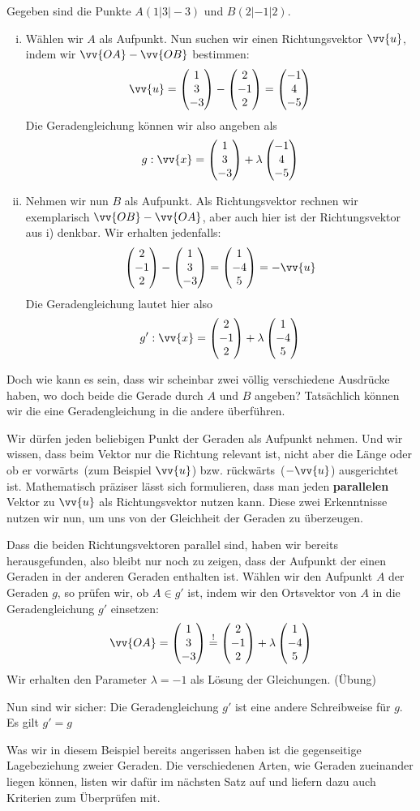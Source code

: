 \documentclass[ngerman, 12pt]{nssheetxea}
\begin{document}
\begin{example}
Gegeben sind die Punkte $A(1|3|-3)$ und $B(2|-1|2)$. 
\begin{enumerate} [i)]
\item Wählen wir $A$ als Aufpunkt. Nun suchen wir einen Richtungsvektor $\vv{u}$, indem wir $\vv{OA}-\vv{OB}$ bestimmen:
\[ \vv{u}= \colvec[1]{3}{-3}-\colvec[2]{-1}{2} = \colvec[-1]{4}{-5}\]
Die Geradengleichung können wir also angeben als 
\[ g:\vv{x} = \colvec[1]{3}{-3}+\lambda \colvec[-1]{4}{-5}\]
\item Nehmen wir nun $B$ als Aufpunkt. Als Richtungsvektor rechnen wir exemplarisch $\vv{OB}-\vv{OA}$, aber auch hier ist der Richtungsvektor aus i) denkbar. Wir erhalten jedenfalls:
\[ \colvec[2]{-1}{2} - \colvec[1]{3}{-3} = \colvec[1]{-4}{5} = -\vv{u}\]
Die Geradengleichung lautet hier also
\[ g':\vv{x} = \colvec[2]{-1}{2} + \lambda \colvec[1]{-4}{5}\]
\end{enumerate}
Doch wie kann es sein, dass wir scheinbar zwei völlig verschiedene Ausdrücke haben, wo doch beide die Gerade durch $A$ und $B$ angeben? Tatsächlich können wir die eine Geradengleichung in die andere überführen. \par
Wir dürfen jeden beliebigen Punkt der Geraden als Aufpunkt nehmen. Und wir wissen, dass beim Vektor nur die Richtung relevant ist, nicht aber die Länge oder ob er \glqq vorwärts\grqq \ (zum Beispiel $\vv{u}$) bzw. \glqq rückwärts\grqq \ ($-\vv{u}$) ausgerichtet ist. Mathematisch präziser lässt sich formulieren, dass man jeden \textbf{parallelen} Vektor zu $\vv{u}$ als Richtungsvektor nutzen kann. Diese zwei Erkenntnisse nutzen wir nun, um uns von der Gleichheit der Geraden zu überzeugen. \par
Dass die beiden Richtungsvektoren parallel sind, haben wir bereits herausgefunden, also bleibt nur noch zu zeigen, dass der Aufpunkt der einen Geraden in der anderen Geraden enthalten ist. Wählen wir den Aufpunkt $A$ der Geraden $g$, so prüfen wir, ob $A\in g'$ ist, indem wir den Ortsvektor von $A$ in die Geradengleichung $g'$ einsetzen:
\[ \vv{OA} = \colvec[1]{3}{-3} \stackrel{!}{=} \colvec[2]{-1}{2} + \lambda \colvec[1]{-4}{5}\]
Wir erhalten den Parameter $\lambda=-1$ als Lösung der Gleichungen. (Übung) \par
Nun sind wir sicher: Die Geradengleichung $g'$ ist eine andere Schreibweise für $g$. Es gilt $g'=g$
\label{Bsp:GeradenGleichung}
\end{example}

Was wir in diesem Beispiel bereits angerissen haben ist die gegenseitige Lagebeziehung zweier Geraden. Die verschiedenen Arten, wie Geraden zueinander liegen können, listen wir dafür im nächsten Satz auf und liefern dazu auch Kriterien zum Überprüfen mit.
\end{document}
